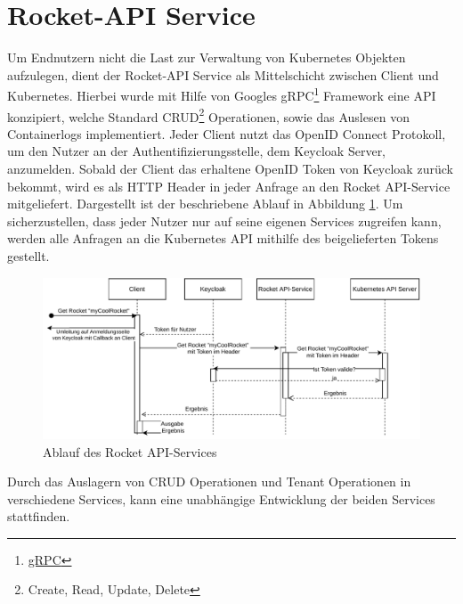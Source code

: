 \section{Rocket-API Service}
\label{sec:komponenten:rocket-api-service}
Um Endnutzern nicht die Last zur Verwaltung von Kubernetes Objekten aufzulegen, dient der Rocket-API Service als Mittelschicht zwischen
Client und Kubernetes. Hierbei wurde mit Hilfe von Googles gRPC\footnote{\href{https://grpc.io/}{gRPC}} Framework
eine API konzipiert, welche Standard CRUD\footnote{Create, Read, Update, Delete} Operationen, sowie das Auslesen
von Containerlogs implementiert.
Jeder Client nutzt das OpenID Connect Protokoll, um den Nutzer an der Authentifizierungsstelle, dem Keycloak
Server, anzumelden. Sobald der Client das erhaltene OpenID Token von Keycloak zurück bekommt,
wird es als HTTP Header in jeder Anfrage an den Rocket API-Service mitgeliefert.
Dargestellt ist der beschriebene Ablauf in Abbildung \ref{fig:rocket-api-service-flow}.
Um sicherzustellen, dass jeder Nutzer nur auf seine eigenen Services zugreifen kann, 
werden alle Anfragen an die Kubernetes API mithilfe des beigelieferten Tokens gestellt.

\begin{figure}[]
  \centering
  \includegraphics[height=0.5\textwidth]{gfx/chapters/3_komponenten/api-service-flow.pdf}
  \caption{Ablauf des Rocket API-Services}
  \label{fig:rocket-api-service-flow}
\end{figure}

Durch das Auslagern von CRUD Operationen und Tenant Operationen in
verschiedene Services, kann eine unabhängige Entwicklung der beiden Services stattfinden.